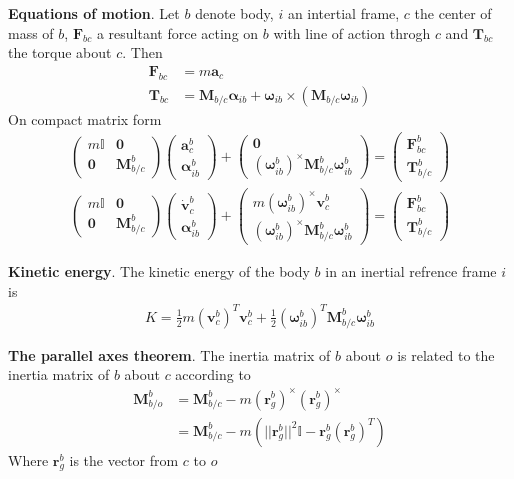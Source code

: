 \textbf{Equations of motion}. Let \(b\) denote body, \(i\) an intertial frame, \(c\) the center of mass of \(b\), \(\bm{F}_{bc}\) a resultant force acting on \(b\) with line of action throgh \(c\) and \(\bm{T}_{bc}\) the torque about \(c\). Then
\begin{align*}
    \bm{F}_{bc} &= m\bm{a}_c \\
    \bm{T}_{bc} &= \bm{M}_{b/c}\bm{\alpha}_{ib} + \bm{\omega}_{ib}\times(\bm{M}_{b/c}\bm{\omega}_{ib})
\end{align*}
On compact matrix form
\begin{align*}
    \begin{pmatrix} m\mathbb{I} & \bm{0} \\ \bm{0} & \bm{M}_{b/c}^b \end{pmatrix}
        \begin{pmatrix}\bm{a}_c^b \\ \bm{\alpha}_{ib}^b \end{pmatrix} + 
        \begin{pmatrix} \bm{0} \\ (\bm{\omega}_{ib}^b)^\times\bm{M}_{b/c}^b\bm{\omega}_{ib}^b\end{pmatrix} =
            \begin{pmatrix}\bm{F}_{bc}^b \\ \bm{T}_{b/c}^b\end{pmatrix} \\
    \begin{pmatrix} m\mathbb{I} & \bm{0} \\ \bm{0} & \bm{M}_{b/c}^b \end{pmatrix}
        \begin{pmatrix}\dot{\bm{v}}_c^b \\ \bm{\alpha}_{ib}^b \end{pmatrix} + 
            \begin{pmatrix} m(\bm{\omega}_{ib}^b)^\times\bm{v}_c^b \\ (\bm{\omega}_{ib}^b)^\times\bm{M}_{b/c}^b\bm{\omega}_{ib}^b\end{pmatrix} =
            \begin{pmatrix}\bm{F}_{bc}^b \\ \bm{T}_{b/c}^b\end{pmatrix}
\end{align*}

\textbf{Kinetic energy}. The kinetic energy of the body \(b\) in an inertial refrence frame \(i\) is
\begin{align*}
    K = \frac{1}{2}m(\bm{v}_c^b)^T\bm{v}_c^b + \frac{1}{2}(\bm{\omega}_{ib}^b)^T\bm{M}_{b/c}^b\bm{\omega}_{ib}^b
\end{align*}

\textbf{The parallel axes theorem}. The inertia matrix of \(b\) about \(o\) is related to the inertia matrix of \(b\) about \(c\) according to
\begin{align*}
    \bm{M}_{b/o}^b &= \bm{M}_{b/c}^b-m(\bm{r}_g^b)^\times(\bm{r}_g^b)^\times \\
    &= \bm{M}_{b/c}^b-m(||\bm{r}_g^b||^2\mathbb{I}-\bm{r}_g^b(\bm{r}_g^b)^T)
\end{align*}
Where \(\bm{r}_g^b\) is the vector from \(c\) to \(o\)
